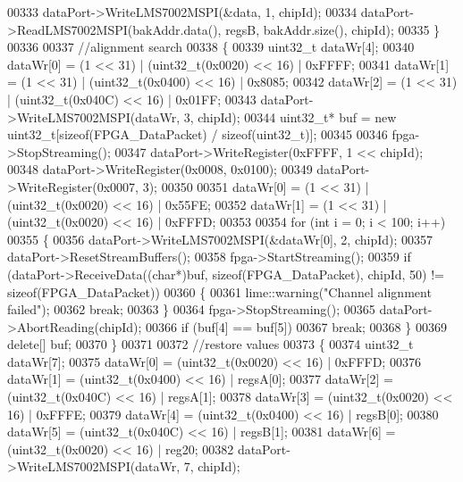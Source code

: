 \begin{DoxyCode}
00333         dataPort->WriteLMS7002MSPI(&data, 1, chipId);
00334         dataPort->ReadLMS7002MSPI(bakAddr.data(), regsB, bakAddr.size(), chipId);
00335     \}
00336 
00337     \textcolor{comment}{//alignment search}
00338     \{
00339         uint32\_t dataWr[4];
00340         dataWr[0] = (1 << 31) | (uint32\_t(0x0020) << 16) | 0xFFFF;
00341         dataWr[1] = (1 << 31) | (uint32\_t(0x0400) << 16) | 0x8085;
00342         dataWr[2] = (1 << 31) | (uint32\_t(0x040C) << 16) | 0x01FF;
00343         dataPort->WriteLMS7002MSPI(dataWr, 3, chipId);
00344         uint32\_t* buf = \textcolor{keyword}{new} uint32\_t[\textcolor{keyword}{sizeof}(FPGA_DataPacket) / \textcolor{keyword}{sizeof}(uint32\_t)];
00345 
00346         fpga->StopStreaming();
00347         dataPort->WriteRegister(0xFFFF, 1 << chipId);
00348         dataPort->WriteRegister(0x0008, 0x0100);
00349         dataPort->WriteRegister(0x0007, 3);
00350 
00351         dataWr[0] = (1 << 31) | (uint32\_t(0x0020) << 16) | 0x55FE;
00352         dataWr[1] = (1 << 31) | (uint32\_t(0x0020) << 16) | 0xFFFD;
00353 
00354         \textcolor{keywordflow}{for} (\textcolor{keywordtype}{int} i = 0; i < 100; i++)
00355         \{
00356             dataPort->WriteLMS7002MSPI(&dataWr[0], 2, chipId);
00357             dataPort->ResetStreamBuffers();
00358             fpga->StartStreaming();
00359             \textcolor{keywordflow}{if} (dataPort->ReceiveData((\textcolor{keywordtype}{char}*)buf, \textcolor{keyword}{sizeof}(FPGA_DataPacket), 
      chipId, 50) != \textcolor{keyword}{sizeof}(FPGA_DataPacket))
00360             \{
00361                 lime::warning(\textcolor{stringliteral}{"Channel alignment failed"});
00362                 \textcolor{keywordflow}{break};
00363             \}
00364             fpga->StopStreaming();
00365             dataPort->AbortReading(chipId);
00366             \textcolor{keywordflow}{if} (buf[4] == buf[5])
00367                 \textcolor{keywordflow}{break};
00368         \}
00369         \textcolor{keyword}{delete}[] buf;
00370     \}
00371 
00372     \textcolor{comment}{//restore values}
00373     \{
00374         uint32\_t dataWr[7];
00375         dataWr[0] = (uint32\_t(0x0020) << 16) | 0xFFFD;
00376         dataWr[1] = (uint32\_t(0x0400) << 16) | regsA[0];
00377         dataWr[2] = (uint32\_t(0x040C) << 16) | regsA[1];
00378         dataWr[3] = (uint32\_t(0x0020) << 16) | 0xFFFE;
00379         dataWr[4] = (uint32\_t(0x0400) << 16) | regsB[0];
00380         dataWr[5] = (uint32\_t(0x040C) << 16) | regsB[1];
00381         dataWr[6] = (uint32\_t(0x0020) << 16) | reg20;
00382         dataPort->WriteLMS7002MSPI(dataWr, 7, chipId);

\end{DoxyCode}
